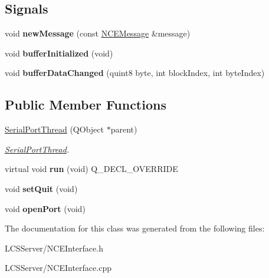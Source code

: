 \subsection*{Signals}
\begin{DoxyCompactItemize}
\item 
\mbox{\label{class_serial_port_thread_afd82dc4692e9acd7b25444b357243688}} 
void {\bfseries new\+Message} (const \hyperlink{class_n_c_e_message}{N\+C\+E\+Message} \&message)
\item 
\mbox{\label{class_serial_port_thread_a9915b851f045269a962a23a53cbd70ce}} 
void {\bfseries buffer\+Initialized} (void)
\item 
\mbox{\label{class_serial_port_thread_aa854a362aa5610ec12ccb9c670c09ee1}} 
void {\bfseries buffer\+Data\+Changed} (quint8 byte, int block\+Index, int byte\+Index)
\end{DoxyCompactItemize}
\subsection*{Public Member Functions}
\begin{DoxyCompactItemize}
\item 
\mbox{\label{class_serial_port_thread_a5dc5088f166705325cc4a4215410b48b}} 
\hyperlink{class_serial_port_thread_a5dc5088f166705325cc4a4215410b48b}{Serial\+Port\+Thread} (Q\+Object $\ast$parent)
\begin{DoxyCompactList}\small\item\em \hyperlink{class_serial_port_thread}{Serial\+Port\+Thread}. \end{DoxyCompactList}\item 
\mbox{\label{class_serial_port_thread_a8cb6df223cc54a75e2f6f2f8a87ad1be}} 
virtual void {\bfseries run} (void) Q\+\_\+\+D\+E\+C\+L\+\_\+\+O\+V\+E\+R\+R\+I\+DE
\item 
\mbox{\label{class_serial_port_thread_af995d293c19c8b18e8bdb0e5b99dd6bb}} 
void {\bfseries set\+Quit} (void)
\item 
\mbox{\label{class_serial_port_thread_a71b5db795c9ffb96071afc4a2a8c71ba}} 
void {\bfseries open\+Port} (void)
\end{DoxyCompactItemize}


The documentation for this class was generated from the following files\+:\begin{DoxyCompactItemize}
\item 
L\+C\+S\+Server/N\+C\+E\+Interface.\+h\item 
L\+C\+S\+Server/N\+C\+E\+Interface.\+cpp\end{DoxyCompactItemize}
